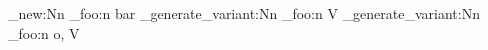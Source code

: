 \cs_new:Nn
  \module_foo:n
  { bar }
\cs_generate_variant:Nn
  \module_foo:n
  { V }
\cs_generate_variant:Nn  %
  \module_foo:n
  { o, V }

